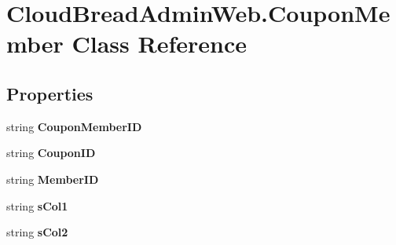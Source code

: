 \hypertarget{class_cloud_bread_admin_web_1_1_coupon_member}{}\section{Cloud\+Bread\+Admin\+Web.\+Coupon\+Member Class Reference}
\label{class_cloud_bread_admin_web_1_1_coupon_member}
\subsection*{Properties}
\begin{DoxyCompactItemize}
\item 
string {\bfseries Coupon\+Member\+ID}\hypertarget{class_cloud_bread_admin_web_1_1_coupon_member_a5be1b0593751dd79916bef28715d56a4}{}\label{class_cloud_bread_admin_web_1_1_coupon_member_a5be1b0593751dd79916bef28715d56a4}

\item 
string {\bfseries Coupon\+ID}\hypertarget{class_cloud_bread_admin_web_1_1_coupon_member_ac6e51f8ba390ea94c968eb4200a2cdef}{}\label{class_cloud_bread_admin_web_1_1_coupon_member_ac6e51f8ba390ea94c968eb4200a2cdef}

\item 
string {\bfseries Member\+ID}\hypertarget{class_cloud_bread_admin_web_1_1_coupon_member_a2e54779f4d98444c9d7a3f94e5d5a130}{}\label{class_cloud_bread_admin_web_1_1_coupon_member_a2e54779f4d98444c9d7a3f94e5d5a130}

\item 
string {\bfseries s\+Col1}\hypertarget{class_cloud_bread_admin_web_1_1_coupon_member_a0e88fed82d66d28960641f8f2479ee59}{}\label{class_cloud_bread_admin_web_1_1_coupon_member_a0e88fed82d66d28960641f8f2479ee59}

\item 
string {\bfseries s\+Col2}\hypertarget{class_cloud_bread_admin_web_1_1_coupon_member_ab1a1f19816bb2e5a4f756571548d687a}{}\label{class_cloud_bread_admin_web_1_1_coupon_member_ab1a1f19816bb2e5a4f756571548d687a}


\end{DoxyCompactItemize}
